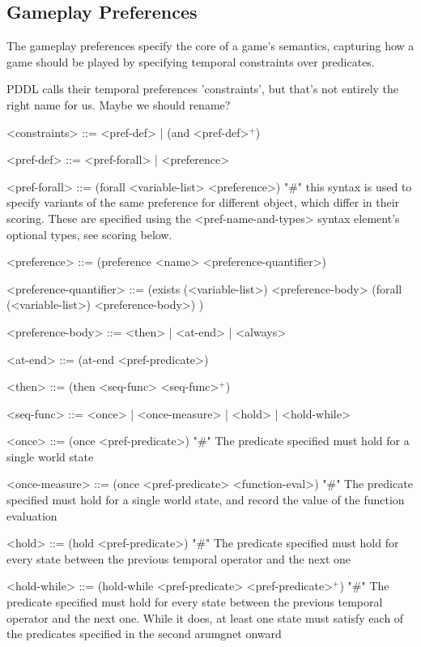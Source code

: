 \documentclass{article}
\begin{document}
\subsection{Gameplay Preferences}
The gameplay preferences specify the core of a game's semantics, capturing how a game should be played by specifying temporal constraints over predicates.

        PDDL calls their temporal preferences 'constraints', but that's not entirely the right name for us. Maybe we should rename? \\

\begin{grammar}
<constraints> ::= <pref-def> | (and <pref-def>$^+$)

<pref-def> ::= <pref-forall> | <preference>

<pref-forall> ::= (forall <variable-list> <preference>) "#" this syntax is used to specify variants of the same preference for different object, which differ in their scoring. These are specified using the <pref-name-and-types> syntax element's optional types, see scoring below.

<preference> ::= (preference <name> <preference-quantifier>)

<preference-quantifier> ::= (exists (<variable-list>) <preference-body>
\alt  (forall (<variable-list>) <preference-body>)
)

<preference-body> ::=  <then> | <at-end> | <always>

<at-end> ::= (at-end <pref-predicate>)

<then> ::= (then <seq-func> <seq-func>$^+$)

<seq-func> ::= <once> | <once-measure> | <hold> | <hold-while>

<once> ::= (once <pref-predicate>) "#" The predicate specified must hold for a single world state

{ \color{teal} <once-measure> ::= (once <pref-predicate> <function-eval>) "#" The predicate specified must hold for a single world state, and record the value of the function evaluation }

<hold> ::= (hold <pref-predicate>) "#" The predicate specified must hold for every state between the previous temporal operator and the next one

<hold-while> ::= (hold-while <pref-predicate> <pref-predicate>$^+$) "#" The predicate specified must hold for every state between the previous temporal operator and the next one. While it does, at least one state must satisfy each of the predicates specified in the second arumgnet onward


\end{grammar}
\end{document}
